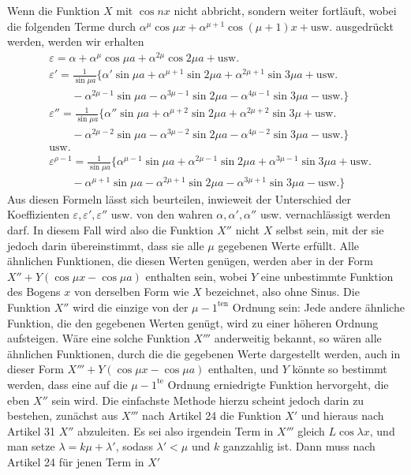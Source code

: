 Wenn die Funktion $X$ mit $\cos nx$ nicht abbricht, sondern weiter fortläuft, wobei die folgenden Terme durch $\alpha^\mu\cos\mu x+\alpha^{\mu+1}\cos(\mu+1)x+\text{usw.}$ ausgedrückt werden, werden wir erhalten
\[
\begin{aligned}
&\varepsilon=\alpha+\alpha^\mu\cos\mu a+\alpha^{2\mu}\cos2\mu a+\text{usw.}\\[5pt]
&\varepsilon'=\frac{1}{\sin\mu a}\{\alpha'\sin\mu a+\alpha^{\mu+1}\sin2\mu a+\alpha^{2\mu+1}\sin3\mu a+\text{usw.}\\[5pt]
&\qquad-\alpha^{2\mu-1}\sin\mu a-\alpha^{3\mu-1}\sin2\mu a-\alpha^{4\mu-1}\sin3\mu a-\text{usw.}\}\\[5pt]
&\varepsilon''=\frac{1}{\sin\mu a}\{\alpha''\sin\mu a+\alpha^{\mu+2}\sin2\mu a+\alpha^{2\mu+2}\sin3\mu+\text{usw.}\\[5pt]
&\qquad-\alpha^{2\mu-2}\sin\mu a-\alpha^{3\mu-2}\sin2\mu a-\alpha^{4\mu-2}\sin3\mu a-\text{usw.}\}\\[5pt]
&\text{usw.}\\[5pt]
&\varepsilon^{\rho-1}=\frac{1}{\sin\mu a}\{\alpha^{\mu-1}\sin\mu a+\alpha^{2\mu-1}\sin2\mu a+\alpha^{3\mu-1}\sin3\mu a+\text{usw.}\\[5pt]
&\qquad-\alpha^{\mu+1}\sin\mu a-\alpha^{2\mu+1}\sin2\mu a-\alpha^{3\mu+1}\sin3\mu a-\text{usw.}\}
\end{aligned}
\]
Aus diesen Formeln lässt sich beurteilen, inwieweit der Unterschied der Koeffizienten $\varepsilon,\varepsilon',\varepsilon''$ usw. von den wahren $\alpha,\alpha',\alpha''$ usw. vernachlässigt werden darf. In diesem Fall wird also die Funktion $X''$ nicht $X$ selbst sein, mit der sie jedoch darin übereinstimmt, dass sie alle $\mu$ gegebenen Werte erfüllt. Alle ähnlichen Funktionen, die diesen Werten genügen, werden aber in der Form $X''+Y(\cos\mu x-\cos\mu a)$ enthalten sein, wobei $Y$ eine unbestimmte Funktion des Bogens $x$ von derselben Form wie $X$ bezeichnet, also ohne Sinus. Die Funktion $X''$ wird die einzige von der $\mu-1^{\mathrm{ten}}$ Ordnung sein: Jede andere ähnliche Funktion, die den gegebenen Werten genügt, wird zu einer höheren Ordnung aufsteigen. Wäre eine solche Funktion $X'''$ anderweitig bekannt, so wären alle ähnlichen Funktionen, durch die die gegebenen Werte dargestellt werden, auch in dieser Form $X'''+Y(\cos\mu x-\cos\mu a)$ enthalten, und $Y$ könnte so bestimmt werden, dass eine auf die $\mu-1^{\mathrm{te}}$ Ordnung erniedrigte Funktion hervorgeht, die eben $X''$ sein wird. Die einfachste Methode hierzu scheint jedoch darin zu bestehen, zunächst aus $X'''$ nach Artikel 24 die Funktion $X'$ und hieraus nach Artikel 31 $X''$ abzuleiten. Es sei also irgendein Term in $X'''$ gleich $L\cos\lambda x$, und man setze $\lambda=k\mu+\lambda'$, sodass $\lambda'<\mu$ und $k$ ganzzahlig ist. Dann muss nach Artikel 24 für jenen Term in $X'$

